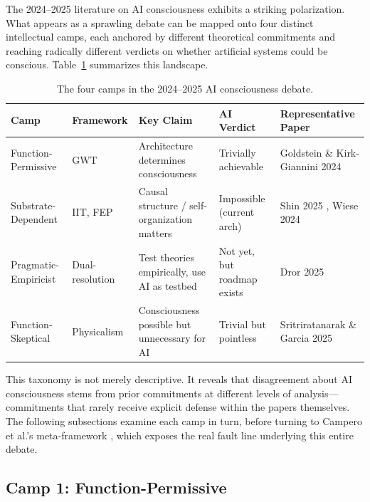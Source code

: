 
The 2024--2025 literature on AI consciousness exhibits a striking polarization. What appears
as a sprawling debate can be mapped onto four distinct intellectual camps, each anchored by
different theoretical commitments and reaching radically different verdicts on whether
artificial systems could be conscious. Table~\ref{tab:camps} summarizes this landscape.

\begin{table}[h]
\centering
\begin{tabular}{|p{2.5cm}|p{2.5cm}|p{3.5cm}|p{2.5cm}|p{3cm}|}
\hline
\textbf{Camp} & \textbf{Framework} & \textbf{Key Claim} & \textbf{AI Verdict} & \textbf{Representative Paper} \\
\hline
Function-Permissive & GWT & Architecture determines consciousness & Trivially achievable & Goldstein \& Kirk-Giannini 2024 \cite{goldstein2024case} \\
\hline
Substrate-Dependent & IIT, FEP & Causal structure / self-organization matters & Impossible (current arch) & Shin 2025 \cite{shin2025iit}, Wiese 2024 \cite{wiese2024fep} \\
\hline
Pragmatic-Empiricist & Dual-resolution & Test theories empirically, use AI as testbed & Not yet, but roadmap exists & Dror 2025 \cite{dror2025dual} \\
\hline
Function-Skeptical & Physicalism & Consciousness possible but unnecessary for AI & Trivial but pointless & Sritriratanarak \& Garcia 2025 \cite{sritriratanarak2025consciousness} \\
\hline
\end{tabular}
\caption{The four camps in the 2024--2025 AI consciousness debate.}
\label{tab:camps}
\end{table}

This taxonomy is not merely descriptive. It reveals that disagreement about AI consciousness
stems from prior commitments at different levels of analysis---commitments that rarely
receive explicit defense within the papers themselves. The following subsections examine each
camp in turn, before turning to Campero et al.'s meta-framework \cite{campero2025taxonomy},
which exposes the real fault line underlying this entire debate.

\subsection{Camp 1: Function-Permissive}

